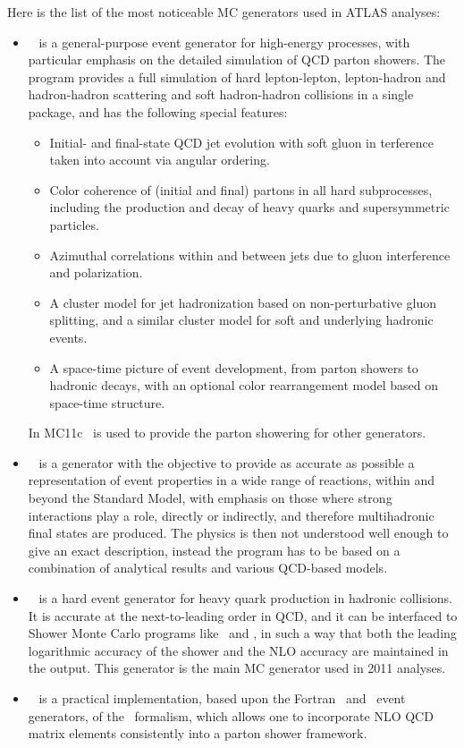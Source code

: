 Here is the list of the most noticeable MC generators used in ATLAS analyses:
\begin{itemize}
\item \Herwig~\cite{lib:MC_herwig} is a general-purpose event generator for high-energy processes, with particular emphasis on the detailed simulation of QCD parton showers. The program provides a full simulation of hard lepton-lepton, lepton-hadron and hadron-hadron scattering and soft hadron-hadron collisions in a single package, and has the following special features:
\begin{itemize}
\item Initial- and final-state QCD jet evolution with soft gluon in terference taken into account via angular ordering.
\item Color coherence of (initial and final) partons in all hard subprocesses, including the production and decay of heavy quarks and supersymmetric particles.
\item Azimuthal correlations within and between jets due to gluon interference and polarization.
\item A cluster model for jet hadronization based on non-perturbative gluon splitting, and a similar cluster model for soft and underlying hadronic events.
\item A space-time picture of event development, from parton showers to hadronic decays, with an optional color rearrangement model based on space-time structure.
\end{itemize}
In MC11c \Herwig\ is used to provide the parton showering for other generators.

\item \Pythia~\cite{lib:MC_pythia} is a generator with the objective to provide as accurate as possible a representation of event properties in a wide range of reactions, within and beyond the Standard Model, with emphasis on those where strong interactions play a role, directly or indirectly, and therefore multihadronic final states are produced. The physics is then not understood well enough to give an exact description, instead the program has to be based on a combination of analytical results and various QCD-based models.

\item \Powheg~\cite{lib:MC_powheg} is a hard event generator for heavy quark production in hadronic collisions. It is accurate at the next-to-leading order in QCD, and it can be interfaced to Shower Monte Carlo programs like \Herwig\ and \Pythia, in such a way that both the leading logarithmic accuracy of the shower and the NLO accuracy are maintained in the output. This generator is the main MC generator used in 2011 analyses.

\item \Mcatnlo~\cite{lib:MC_mcatnlo} is a practical implementation, based upon the Fortran \Herwig\ and \Herwigpp\ event generators, of the \Mcatnlo\ formalism, which allows one to incorporate NLO QCD matrix elements consistently into a parton shower framework.

\end{itemize}

